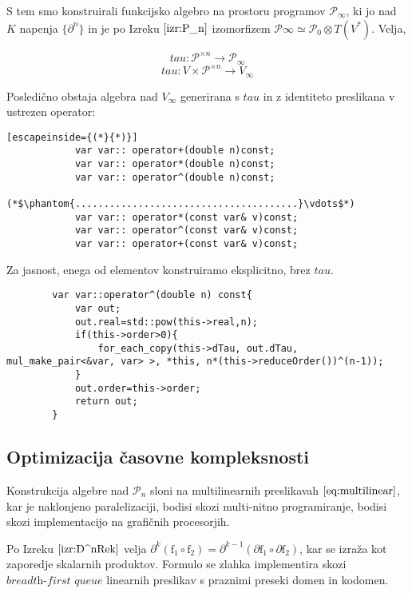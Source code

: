 \documentclass{article}
\newcommand{\dP}{\mathcal{P}}
\newcommand{\D}{\partial}
\begin{document}
      S tem smo konstruirali funkcijsko algebro na prostoru programov $\dP_\infty$, ki jo nad $K$ napenja $\{\D^n\}$ in je po Izreku $\ref{izr:P_n}$ izomorfizem $\dP\infty\simeq\dP_0\otimes T(V^*)$. Velja,
      
      $$tau:\dP^{\times n}\to \dP_\infty$$
      $$tau:V\times\dP^{\times n}\to V_\infty$$
    
    Posledično obstaja algebra nad $V_\infty$ generirana s $tau$ in z identiteto preslikana v ustrezen operator:
        
        \begin{lstlisting}[escapeinside={(*}{*)}]
       	    var var:: operator+(double n)const;
            var var:: operator*(double n)const;
            var var:: operator^(double n)const;
            (*$\phantom{.......................................}\vdots$*)
            var var:: operator*(const var& v)const;
            var var:: operator^(const var& v)const;
            var var:: operator+(const var& v)const;
        \end{lstlisting}
      Za jasnost, enega od elementov konstruiramo eksplicitno, brez $tau$.
      
      \begin{lstlisting}
        var var::operator^(double n) const{
            var out;
            out.real=std::pow(this->real,n);
            if(this->order>0){
            	for_each_copy(this->dTau, out.dTau, mul_make_pair<&var, var> >, *this, n*(this->reduceOrder())^(n-1));
            }
            out.order=this->order;
            return out;
        }
        \end{lstlisting}
        
\subsection{Optimizacija časovne kompleksnosti}

Konstrukcija algebre nad $\dP_n$ sloni na multilinearnih preslikavah $\eqref{eq:multilinear}$, kar je naklonjeno paralelizaciji, bodisi skozi multi-nitno programiranje, bodisi skozi implementacijo na grafičnih procesorjih.

Po Izreku $\ref{izr:D^nRek}$ velja  $\D^k(\mathrm{f_1}\circ \mathrm{f_2})=\D^{k-1}(\D \mathrm{f_1}\circ\D \mathrm{f_2})$, kar se izraža kot zaporedje skalarnih produktov. Formulo se zlahka implementira skozi $\textit{breadth-first queue}$ linearnih preslikav s praznimi preseki domen in kodomen.   
\end{document}
